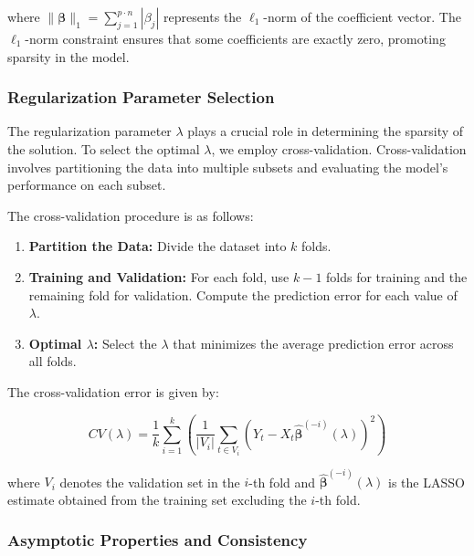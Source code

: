 \documentclass[12pt]{article}
\begin{document}
where \(\|\boldsymbol{\beta}\|_1 = \sum_{j=1}^{p \cdot n} |\beta_j|\) represents the \(\ell_1\)-norm of the coefficient vector. The \(\ell_1\)-norm constraint ensures that some coefficients are exactly zero, promoting sparsity in the model.

\subsubsection{Regularization Parameter Selection}

The regularization parameter \(\lambda\) plays a crucial role in determining the sparsity of the solution. To select the optimal \(\lambda\), we employ cross-validation. Cross-validation involves partitioning the data into multiple subsets and evaluating the model's performance on each subset.

The cross-validation procedure is as follows:
\begin{enumerate}
    \item \textbf{Partition the Data:} Divide the dataset into \(k\) folds.
    \item \textbf{Training and Validation:} For each fold, use \(k-1\) folds for training and the remaining fold for validation. Compute the prediction error for each value of \(\lambda\).
    \item \textbf{Optimal \(\lambda\):} Select the \(\lambda\) that minimizes the average prediction error across all folds.
\end{enumerate}

The cross-validation error is given by:

\[
CV(\lambda) = \frac{1}{k} \sum_{i=1}^k \left( \frac{1}{|V_i|} \sum_{t \in V_i} \left( Y_t - X_t \hat{\boldsymbol{\beta}}^{(-i)}(\lambda) \right)^2 \right)
\]

where \(V_i\) denotes the validation set in the \(i\)-th fold and \(\hat{\boldsymbol{\beta}}^{(-i)}(\lambda)\) is the LASSO estimate obtained from the training set excluding the \(i\)-th fold.



\subsubsection{Asymptotic Properties and Consistency}
\end{document}
